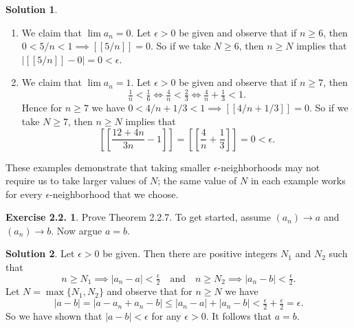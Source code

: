 \documentclass[12pt]{article}
\theoremstyle{definition}
\theoremstyle{exercise}
\newtheorem{exercise}{Exercise 2.2.}
\theoremstyle{solution}
\newtheorem*{solution}{Solution}
\begin{document}
\begin{solution}
    \begin{enumerate}
        \item We claim that \( \lim a_n = 0 \). Let \( \epsilon > 0 \) be given and observe that if \( n \geq 6 \), then \( 0 < 5/n < 1 \implies [[5/n]] = 0 \). So if we take \( N \geq 6 \), then \( n \geq N \) implies that \( |[[5/n]] - 0| = 0 < \epsilon \).

        \item We claim that \( \lim a_n = 1 \). Let \( \epsilon > 0 \) be given and observe that if \( n \geq 7 \), then
        \[
            \tfrac{1}{n} < \tfrac{1}{6} \iff \tfrac{4}{n} < \tfrac{2}{3} \iff \tfrac{4}{n} + \tfrac{1}{3} < 1.
        \]
        Hence for \( n \geq 7 \) we have \( 0 < 4/n + 1/3 < 1 \implies [[4/n + 1/3]] = 0 \). So if we take \( N \geq 7 \), then \( n \geq N \) implies that
        \[
            \left[ \left[ \frac{12 + 4n}{3n} - 1 \right] \right] = \left[ \left[ \frac{4}{n} + \frac{1}{3} \right] \right] = 0 < \epsilon.
        \]
    \end{enumerate}
    These examples demonstrate that taking smaller \(\epsilon\)-neighborhoods may not require us to take larger values of \( N \); the same value of \( N \) in each example works for every \(\epsilon\)-neighborhood that we choose.
\end{solution}

\begin{exercise}
\label{ex:6}
    Prove Theorem 2.2.7. To get started, assume \( (a_n) \to a \) and \( (a_n) \to b \). Now argue \( a = b \).
\end{exercise}

\begin{solution}
    Let \( \epsilon > 0 \) be given. Then there are positive integers \( N_1 \) and \( N_2 \) such that
    \[
        n \geq N_1 \implies |a_n - a| < \tfrac{\epsilon}{2} \quad \text{and} \quad n \geq N_2 \implies |a_n - b| < \tfrac{\epsilon}{2}.
    \]
    Let \( N = \max \{ N_1, N_2 \} \) and observe that for \( n \geq N \) we have
    \[
        |a - b| = |a - a_n + a_n - b| \leq |a_n - a| + |a_n - b| < \tfrac{\epsilon}{2} + \tfrac{\epsilon}{2} = \epsilon.
    \]
    So we have shown that \( |a - b| < \epsilon \) for any \( \epsilon > 0 \). It follows that \( a = b \).
\end{solution}
\end{document}
